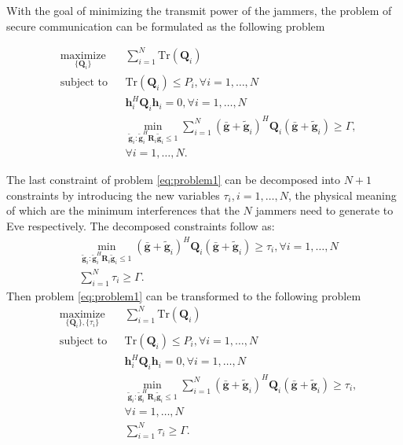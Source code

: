 \documentclass[12pt, journal,onecolumn,draftclsnofoot]{IEEEtran}
\begin{document}
With the goal of minimizing the transmit power of the jammers, the problem of secure communication can be formulated as the following problem

\begin{equation}
\begin{aligned} \label{eq:problem1}
& \underset{\{\mathbf{Q}_i\}}{\text{maximize}}
& & \sum_{i = 1}^{N}\mathrm{Tr}(\mathbf{Q}_i) \\
& \text{subject to}
& & \mathrm{Tr}(\mathbf{Q}_i) \leq P_i, \forall i = 1, \ldots, N\\
&&& \mathbf{h}_i^H \mathbf{Q}_i \mathbf{h}_i= 0, \forall i = 1,\ldots,N\\
&&& \min_{\tilde{\mathbf{g}}_i: \tilde{\mathbf{g}}_i^H \mathbf{R}_i\tilde{\mathbf{g}}_i \leq 1}\sum_{i=1}^{N}(\bar{\mathbf{g}}+\tilde{\mathbf{g}}_i)^H\mathbf{Q}_i(\bar{\mathbf{g}}+\tilde{\mathbf{g}}_i) \geq  \Gamma,\\
&&& \forall i = 1, \ldots, N.
\end{aligned}
\end{equation}


The last constraint of problem \eqref{eq:problem1} can be decomposed into $N+1$ constraints by introducing the new variables $\tau_i, i =1,\ldots,N$, the physical meaning of which are the minimum interferences that the $N$ jammers need to generate to Eve respectively. The decomposed constraints follow as:
\begin{eqnarray}
&\underset{\tilde{\mathbf{g}}_i: \tilde{\mathbf{g}}_i^H \mathbf{R}_i\tilde{\mathbf{g}}_i \leq 1}\min(\bar{\mathbf{g}}+\tilde{\mathbf{g}}_i)^H\mathbf{Q}_i(\bar{\mathbf{g}}+\tilde{\mathbf{g}}_i) \geq  \tau_i, \forall i = 1,\ldots,N\label{eq:artificial noise constraint decomposed}\nonumber\\
&\sum_{i =1}^{N}\tau_i \geq \Gamma.
\end{eqnarray}
Then problem \eqref{eq:problem1} can be transformed to the following problem
\begin{equation}
\begin{aligned} \label{eq:problem2}
& \underset{\{\mathbf{Q}_i\},\{\tau_i\}}{\text{maximize}}
& & \sum_{i = 1}^{N}\mathrm{Tr}(\mathbf{Q}_i) \\
& \text{subject to}
& & \mathrm{Tr}(\mathbf{Q}_i) \leq P_i, \forall i = 1, \ldots, N\\
&&& \mathbf{h}_i^H \mathbf{Q}_i \mathbf{h}_i= 0, \forall i = 1,\ldots,N\\
&&& \min_{\tilde{\mathbf{g}}_i: \tilde{\mathbf{g}}_i^H \mathbf{R}_i\tilde{\mathbf{g}}_i \leq 1}\sum_{i=1}^{N}(\bar{\mathbf{g}}+\tilde{\mathbf{g}}_i)^H\mathbf{Q}_i(\bar{\mathbf{g}}+\tilde{\mathbf{g}}_i) \geq  \tau_i,\\
&&&\forall i = 1,\ldots,N\\
&&&\sum_{i =1}^{N}\tau_i \geq \Gamma.
\end{aligned}
\end{equation}
\end{document}
